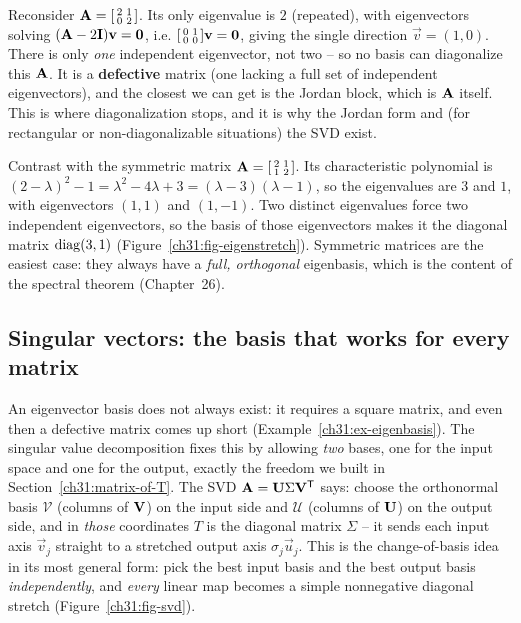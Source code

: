 \begin{example}
\label{ch31:ex-eigenbasis}
Reconsider $\mat{A}=\begin{bsmallmatrix}2&1\\0&2\end{bsmallmatrix}$. Its only
eigenvalue is $2$ (repeated), with eigenvectors solving
$(\mat{A}-2\mat{I})\vec{v}=\vec{0}$, i.e.
$\begin{bsmallmatrix}0&1\\0&0\end{bsmallmatrix}\vec{v}=\vec0$, giving the single
direction $\vec{v}=(1,0)$. There is only \emph{one} independent
eigenvector, not two -- so no basis can diagonalize this $\mat{A}$. It is a
\textbf{defective} matrix (one lacking a full set of independent eigenvectors), and the closest we can get is the Jordan block, which is
$\mat{A}$ itself. This is where diagonalization stops, and it is
why the Jordan form and (for rectangular or non-diagonalizable situations) the SVD
exist.

Contrast with the symmetric matrix
$\mat{A}=\begin{bsmallmatrix}2&1\\1&2\end{bsmallmatrix}$. Its characteristic
polynomial is $(2-\lambda)^2-1=\lambda^2-4\lambda+3=(\lambda-3)(\lambda-1)$, so the
eigenvalues are $3$ and $1$, with eigenvectors $(1,1)$ and $(1,-1)$.
Two distinct eigenvalues force two independent eigenvectors, so the basis of those
eigenvectors makes it the diagonal matrix $\diag(3,1)$
(Figure~\ref{ch31:fig-eigenstretch}). Symmetric matrices are the easiest case:
they always have a \emph{full, orthogonal} eigenbasis, which is the content
of the spectral theorem (Chapter~26).
\end{example}

\subsection{Singular vectors: the basis that works for every matrix}
\label{ch31:svd-basis}

An eigenvector basis does not always exist: it requires a square matrix, and even
then a defective matrix comes up short (Example~\ref{ch31:ex-eigenbasis}). The singular value decomposition
fixes this by allowing \emph{two} bases, one for the input space and one for the
output, exactly the freedom we built in Section~\ref{ch31:matrix-of-T}. The SVD
$\mat{A}=\mat{U}\Sigma\mat{V}\T$ says: choose the orthonormal basis $\mathcal{V}$
(columns of $\mat{V}$) on the input side and $\mathcal{U}$ (columns of $\mat{U}$)
on the output side, and in \emph{those} coordinates $T$ is the diagonal matrix
$\Sigma$ -- it sends each input axis $\vec{v}_j$ straight to a stretched output
axis $\sigma_j\vec{u}_j$. This is the change-of-basis idea in its most general
form: pick the best input basis and the best output basis
\emph{independently}, and \emph{every} linear map becomes a simple nonnegative
diagonal stretch (Figure~\ref{ch31:fig-svd}).

